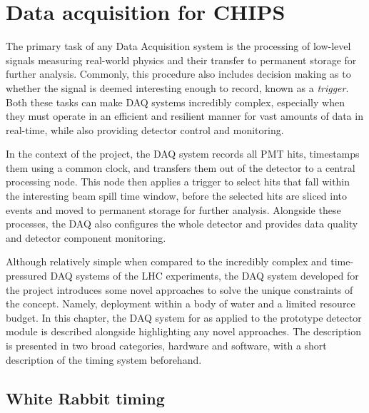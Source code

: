 \chapter{Data acquisition for CHIPS} %
\label{chap:daq} %

The primary task of any Data Acquisition system is the processing of low-level signals measuring
real-world physics and their transfer to permanent storage for further analysis. Commonly, this
procedure also includes decision making as to whether the signal is deemed interesting enough to
record, known as a \emph{trigger}. Both these tasks can make DAQ systems incredibly complex,
especially when they must operate in an efficient and resilient manner for vast amounts of data in
real-time, while also providing detector control and monitoring.

In the context of the \chips project, the DAQ system records all PMT hits, timestamps them using a
common clock, and transfers them out of the detector to a central processing node. This node then
applies a trigger to select hits that fall within the interesting \numi beam spill time window,
before the selected hits are sliced into events and moved to permanent storage for further
analysis. Alongside these processes, the DAQ also configures the whole detector and provides data
quality and detector component monitoring.

Although relatively simple when compared to the incredibly complex and time-pressured DAQ systems
of the LHC experiments, the DAQ system developed for the \chips project introduces some novel
approaches to solve the unique constraints of the \chips concept. Namely, deployment within a body
of water and a limited resource budget. In this chapter, the DAQ system for \chips as applied to
the \chipsfive prototype detector module is described alongside highlighting any novel approaches.
The description is presented in two broad categories, hardware and software, with a short
description of the timing system beforehand.

\section{White Rabbit timing} %
\label{sec:daq_timing} %

